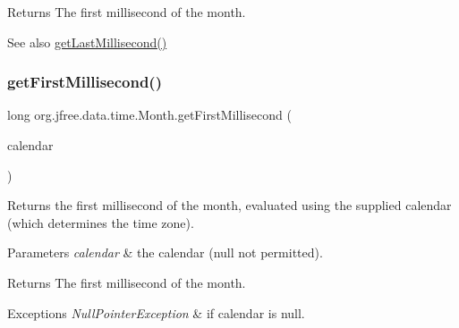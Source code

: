 \begin{DoxyReturn}{Returns}
The first millisecond of the month.
\end{DoxyReturn}
\begin{DoxySeeAlso}{See also}
\mbox{\hyperlink{classorg_1_1jfree_1_1data_1_1time_1_1_month_a34520ffd8f368cd11afc837840e77513}{get\+Last\+Millisecond()}} 
\end{DoxySeeAlso}
\mbox{\label{classorg_1_1jfree_1_1data_1_1time_1_1_month_a5e63ba287f7ebce364099d82cbe393b6}} 
\subsubsection{\texorpdfstring{get\+First\+Millisecond()}{getFirstMillisecond()}\hspace{0.1cm}{\footnotesize\ttfamily [2/2]}}
{\footnotesize\ttfamily long org.\+jfree.\+data.\+time.\+Month.\+get\+First\+Millisecond (\begin{DoxyParamCaption}\item[{Calendar}]{calendar }\end{DoxyParamCaption})}

Returns the first millisecond of the month, evaluated using the supplied calendar (which determines the time zone).


\begin{DoxyParams}{Parameters}
{\em calendar} & the calendar ({\ttfamily null} not permitted).\\
\hline
\end{DoxyParams}
\begin{DoxyReturn}{Returns}
The first millisecond of the month.
\end{DoxyReturn}

\begin{DoxyExceptions}{Exceptions}
{\em Null\+Pointer\+Exception} & if {\ttfamily calendar} is {\ttfamily null}. \\
\hline
\end{DoxyExceptions}
\mbox{\label{classorg_1_1jfree_1_1data_1_1time_1_1_month_a34520ffd8f368cd11afc837840e77513}} 
